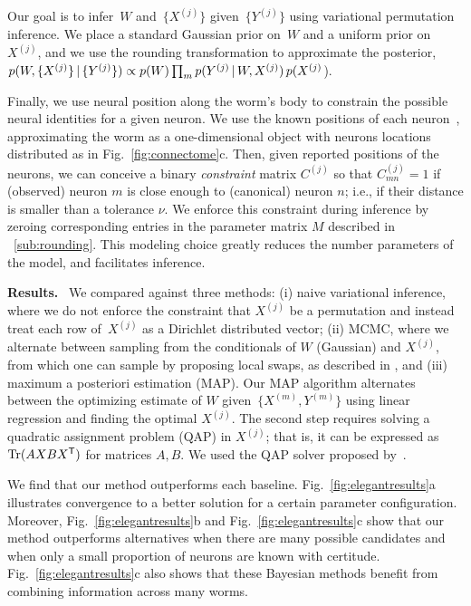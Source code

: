 \documentclass[twoside]{article}
\DeclareRobustCommand{\parhead}[1]{\textbf{#1}~}
\begin{document}
Our goal is to infer~$W$ and~$\{X^{(j)}\}$ given~$\{Y^{(j)}\}$ using
variational permutation inference.  We place a standard Gaussian prior
on~$W$ and a uniform prior on~$X^{(j)}$, and we use the rounding
transformation to approximate the posterior,
$p(W,\{X^{(j)}\} \, | \, \{Y^{(j)}\})\propto p(W) \prod_m p(Y^{(j)} \, | \, W, {X^{(j)}}) \,  p({X^{(j)}}$).

Finally, we use neural position along the worm's body to constrain the
possible neural identities for a given neuron.
We use the known positions of each neuron~\citep{wormatlas}, approximating
the worm as a one-dimensional object with neurons locations distributed
as in Fig.~\ref{fig:connectome}c. Then, given reported positions of the
neurons, we can conceive a binary \textit{constraint} matrix
$C^{(j)}$ so that $C^{(j)}_{mn}=1$ if (observed) neuron $m$ is close enough
to (canonical) neuron $n$; i.e., if their distance is smaller than a
tolerance $\nu$. We enforce this constraint during inference by
zeroing corresponding entries in the parameter matrix $M$ described in
~\ref{sub:rounding}.  This modeling choice greatly reduces the number
parameters of the model, and facilitates inference. 

\parhead{Results.} We compared against three methods: (i) naive
variational inference, where we do not enforce the constraint that
$X^{(j)}$ be a permutation and instead treat each row of~$X^{(j)}$ as
a Dirichlet distributed vector; (ii) MCMC, where we alternate between
sampling from the conditionals of $W$ (Gaussian) and ${X^{(j)}}$, from
which one can sample by proposing local swaps, as described in
\cite{Diaconis2009}, and (iii) maximum a posteriori estimation (MAP).
Our MAP algorithm alternates between the optimizing estimate of $W$ given~$\{X^{(m)}, Y^{(m)}\}$ using linear regression and finding the optimal ${X^{(j)}}$. The second step requires solving a quadratic assignment
problem (QAP) in ${X^{(j)}}$; that is, it can be expressed as
$\mathrm{Tr}(AXBX^{\mathsf{T}})$ for matrices $A,B$. We used the QAP solver
proposed by~\citet{Vogelstein2015}.


We find that our method outperforms each
baseline. Fig.~\ref{fig:elegantresults}a illustrates convergence to a
better solution for a certain parameter configuration. Moreover,
Fig.~\ref{fig:elegantresults}b and Fig.~\ref{fig:elegantresults}c show
that our method outperforms alternatives when there are many possible
candidates and when only a small proportion of neurons are known with
certitude. Fig.~\ref{fig:elegantresults}c also shows that these
Bayesian methods benefit from combining information across many
worms.
\end{document}
